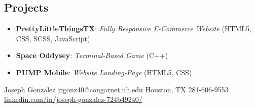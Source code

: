 \documentclass[lighthipster]{simplehipstercv}
\newlength{\rightcolwidth}
\begin{document}
\begin{paracol}{2}
\begin{minipage}[t]{0.3\textwidth}
\end{minipage}\hfill
\begin{minipage}[t]{0.3\textwidth}
    \section*{Projects}
    \vspace{0.5em} %
    \begin{itemize}
        \item \textbf{PrettyLittleThingsTX}: \emph{Fully Responsive E-Commerce Website} (HTML5, CSS, SCSS, JavaScript)
        \item \textbf{Space Oddysey}: \emph{Terminal-Based Game} (C++)
        \item \textbf{PUMP Mobile}: \emph{Website Landing-Page} (HTML5, CSS)
    \end{itemize}
    \end{minipage}
    \bigskip
    
    






\vfill{} %
\hfill{}
\setlength{\parindent}{0pt}
\begin{minipage}[t]{\rightcolwidth}
\begin{center}\fontfamily{\sfdefault}\selectfont \color{black!70}
{\small Joseph Gonzalez jrgonz40@cougarnet.uh.edu  Houston, TX  281-606-9553 \newline{} \protect\url{linkedin.com/in/joseph-gonzalez-724b49240/}
}
\end{center}
\end{minipage}

\end{paracol}
\end{document}

